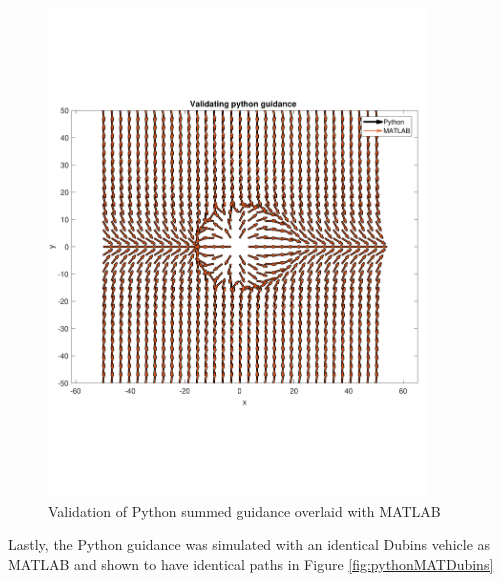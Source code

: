 \documentclass[numbered,pdftex]{ohio-etd}
\begin{document}
\begin{figure}[H]
	\centering
	\includegraphics[trim=0 140 0 140,clip,width=10cm]{PaperFigures/Methods/resultsPython/summedFields}
	\caption{Validation of Python summed guidance overlaid with MATLAB}
	\label{fig:valPythonSummed}
\end{figure}

Lastly, the Python guidance was simulated with an identical Dubins vehicle as MATLAB and shown to have identical paths in Figure \ref{fig:pythonMATDubins}
\end{document}

